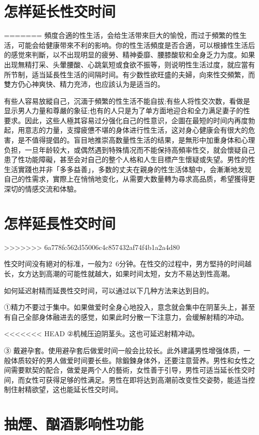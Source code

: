\documentclass[12pt,UTF8]{ctexbook}
\begin{document}
\section{怎样延长性交时间}
=======
頻度合適的性生活，会给生活带來巨大的愉悅，而过于頻繁的性生活，可能会给健康带來不利的影响。你的性生活頻度是否合適，可以根據性生活后的感觉來判斷，以不出现明显的疲勞、精神委靡、腰膝酸软和全身乏力为度。如果出现無精打采、头暈腰酸、心跳氣短或食欲不振等，则说明性生活过度，就应當有所节制，适当延長性生活的间隔时间。有少数性欲旺盛的夫婦，向來性交頻繁，而雙方仍心神爽快、精力充沛，也应該认为是适当的。

有些人容易放縱自己，沉湎于頻繁的性生活不能自拔;有些人将性交次数，看做是显示男人力量和尊嚴的象征;也有的人只是为了单方面地迎合和全力满足妻子的性要求。因此，这些人極其容易过分强化自己的性意识，企圖在最短的时间内再度勃起，用意志的力量，支撐疲憊不堪的身体进行性生活，这对身心健康会有很大的危害，是不值得提倡的。盲目地推崇高数量性生活的结果，是無形中加重身体和心理负担，一旦年龄较大，或偶然遇到特殊情况而不能保持高頻率性交，就会懷疑自己患了性功能障礙，甚至会对自己的整个人格和人生目標产生懷疑或失望。男性的性生活實踐也并非「多多益善」，多数的丈夫在親身的性生活体驗中，会漸漸地发现自己的性需求，實際上在悄悄地变化，从需要大数量轉为尋求高品质，希望獲得更深切的情感交流和体驗。

\section{怎样延長性交时间}
>>>>>>> 6a778fc562d55006c4c857432af74f4b1a2a4d80

性交时间没有絕对的标准，一般为2~6分钟。在性交的过程中，男方堅持的时间越长，女方达到高潮的可能性就越大，如果时间太短，女方不易达到性高潮。

如何延迟射精而延畏性交时间，可以通过以下几种方法来达到目的。

①精力不要过于集中。如果做爱时全身心地投入，意念就会集中在阴茎头上，甚至有自己全部身体融进去的感觉，如果此时分散一下注意力，会缓解射精的冲动。

<<<<<<< HEAD
②机械压迫阴茎头。这也可延迟射精冲动。

③ 戴避孕套。使用避孕套后做爱时间一般会比较长。此外建議男性增强体质，一般体质较好的男人做爱时间要长些。除鍛鍊身体外，还要注意营养。男性和女性之间需要默契的配合，做爱是两个人的藝術，女性善于引导，男性可适当延长性交时间，而女性可获得足够的性满足。男性在即将达到高潮前改变性交姿勢，能适当控制住射精欲望，这也能延长性交时间。

\section{抽煙、酗酒影响性功能}
\end{document}
